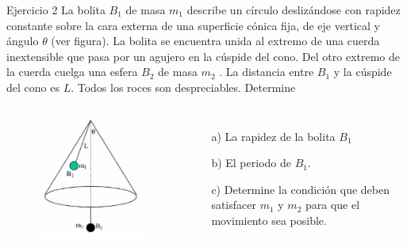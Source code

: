   \begin{frame}{Ejercicio 2}
      La bolita $B_1$ de masa $m_1$ describe un círculo deslizándose con rapidez constante sobre la cara externa de una superficie cónica fija, de eje vertical y ángulo $\theta$ (ver figura). La bolita se encuentra unida al extremo de una cuerda inextensible que pasa por un agujero en la cúspide del cono. Del otro extremo de la cuerda cuelga una esfera $B_2$ de masa $m_2$ . La distancia entre $B_1$ y la cúspide del cono es $L$. Todos los roces son despreciables. Determine
      \begin{columns}
\begin{figure}
          \centering
          \includegraphics[width=0.75\linewidth]{figures/cono-2.png}
      \end{figure}

          \begin{enumerate}
	\item[a)] La rapidez de la bolita $B_1$
	\item[b)] El periodo de $B_1$.
	\item[c)] Determine la condición que deben satisfacer $m_1$ y $m_2$ para que el movimiento sea posible.
\end{enumerate}
      \end{columns}
      

  \end{frame}

